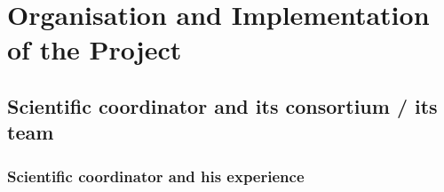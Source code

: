 \documentclass[a4paper,11pt]{article}
\begin{document}

\section[Organisation and Implementation of the Project]{Organisation and Implementation of the Project}



\subsection[Scientific coordinator and its consortium]{Scientific coordinator and its consortium / its team}




\subsubsection{Scientific coordinator and his experience}
\end{document}
